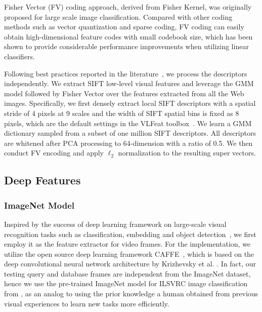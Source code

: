 \documentclass[11pt,twocolumn,twoside]{IEEEtran}
\begin{document}
Fisher Vector (FV) coding approach, derived from Fisher Kernel, was originally proposed for large scale image classification.
Compared with other coding methods such as vector quantization and sparse coding, FV coding can easily obtain high-dimensional feature codes with
small codebook size, which has been shown to provide considerable performance improvements when utilizing linear classifiers.

Following best practices reported in the literature~\cite{Early_Fusion}, we process the descriptors independently.
We extract SIFT low-level visual features and leverage the GMM model followed by Fisher Vector over the features extracted from all the Web images.
Specifically, we first densely extract local SIFT descriptors with a spatial stride of 4 pixels at 9 scales and the width of SIFT spatial bins is fixed as 8 pixels, which
are the default settings in the VLFeat toolbox~\cite{VLFeat}. We learn a GMM dictionary sampled from a subset of one million SIFT descriptors. All descriptors are
whitened after PCA processing to 64-dimension with a ratio of 0.5. We then conduct FV encoding and apply $\ell_{2}$ normalization to the resulting super vectors.



\subsection{Deep Features}\label{subsec3}

\subsubsection{ImageNet Model}
Inspired by the success of deep learning framework on large-scale visual recognition tasks such as classification,
embedding and object detection~\cite{ImageNet_challenge}, we first employ it as the feature extractor for video frames. For the implementation, we utilize the open
source deep learning framework CAFFE~\cite{CAFFE}, which is based on the deep convolutional neural network architecture by
Krizhevsky et al. \cite{Alex_NIPS12}. In fact, our testing query and database frames are independent from the ImageNet dataset,
hence we use the pre-trained ImageNet model for ILSVRC image classification from \cite{LSVRC}, as an analog to using the prior knowledge
a human obtained from previous visual experiences to learn new tasks more efficiently.
\end{document}
